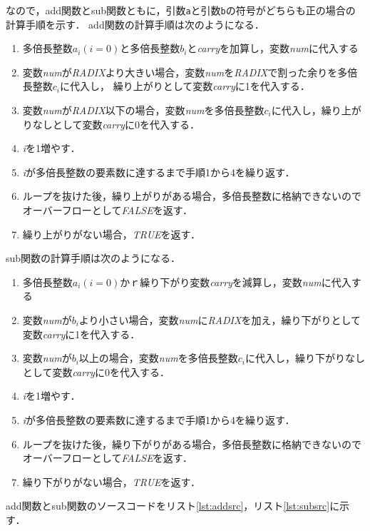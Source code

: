 \documentclass[a4paper,11pt,dvipdfmx]{jsarticle}
\begin{document}
なので，add関数とsub関数ともに，引数\texttt{a}と引数\texttt{b}の符号がどちらも正の場合の計算手順を示す．
add関数の計算手順は次のようになる．

\begin{enumerate}
        \item 多倍長整数$a_i(i = 0)$と多倍長整数$b_i$と\textit{carry}を加算し，変数\textit{num}に代入する
        \item 変数\textit{num}が\textit{RADIX}より大きい場合，変数\textit{num}を\textit{RADIX}で割った余りを多倍長整数$c_i$に代入し，
        繰り上がりとして変数\textit{carry}に1を代入する．
        \item 変数\textit{num}が\textit{RADIX}以下の場合，変数\textit{num}を多倍長整数$c_i$に代入し，繰り上がりなしとして変数\textit{carry}に0を代入する．
        \item \textit{i}を1増やす．
        \item \textit{i}が多倍長整数の要素数に達するまで手順1から4を繰り返す．
        \item ループを抜けた後，繰り上がりがある場合，多倍長整数に格納できないのでオーバーフローとして\textit{FALSE}を返す．
        \item 繰り上がりがない場合，\textit{TRUE}を返す．
\end{enumerate}

sub関数の計算手順は次のようになる．

\begin{enumerate}
        \item 多倍長整数$a_i(i = 0)$かｒ繰り下がり変数\textit{carry}を減算し，変数\textit{num}に代入する
        \item 変数\textit{num}が$b_i$より小さい場合，変数\textit{num}に\textit{RADIX}を加え，繰り下がりとして変数\textit{carry}に1を代入する．
        \item 変数\textit{num}が$b_i$以上の場合，変数\textit{num}を多倍長整数$c_i$に代入し，繰り下がりなしとして変数\textit{carry}に0を代入する．
        \item \textit{i}を1増やす．
        \item \textit{i}が多倍長整数の要素数に達するまで手順1から4を繰り返す．
        \item ループを抜けた後，繰り下がりがある場合，多倍長整数に格納できないのでオーバーフローとして\textit{FALSE}を返す．
        \item 繰り下がりがない場合，\textit{TRUE}を返す．
\end{enumerate}

add関数とsub関数のソースコードをリスト\ref{lst:addsrc}，リスト\ref{lst:subsrc}に示す．
\end{document}
